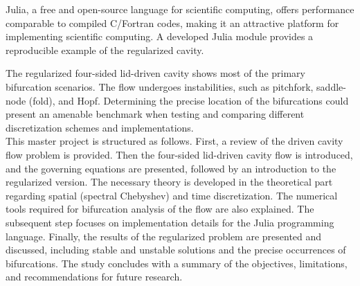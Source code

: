 Julia, a free and open-source language for scientific computing, offers
performance comparable to compiled C/Fortran codes, making it an attractive
platform for implementing scientific computing. A developed Julia module
provides a reproducible example of the regularized cavity.

The regularized four-sided lid-driven cavity shows most of the primary
bifurcation scenarios. The flow undergoes instabilities, such as pitchfork,
saddle-node (fold), and Hopf. Determining the precise location of the
bifurcations could present an amenable benchmark when testing and comparing
different discretization schemes and implementations. \\

This master project is structured as follows. First, a review of the driven
cavity flow problem is provided. Then the four-sided lid-driven cavity flow is
introduced, and the governing equations are presented, followed by an
introduction to the regularized version. The necessary theory is developed in
the theoretical part regarding spatial (spectral Chebyshev) and time
discretization. The numerical tools required for bifurcation analysis of the
flow are also explained. The subsequent step focuses on implementation details
for the Julia programming language. Finally, the results of the regularized
problem are presented and discussed, including stable and unstable solutions
and the precise occurrences of bifurcations. The study concludes with a summary
of the objectives, limitations, and recommendations for future research.

